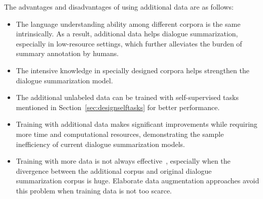The advantages and disadvantages of using additional data are as follows:
\begin{itemize}
	\item[\Checkmark] The language understanding ability among different 
corpora is the same intrinsically. As a result, additional data helps 
dialogue summarization, especially in low-resource settings, 
which further alleviates the burden of summary annotation by humans.
	\item[\Checkmark] The intensive knowledge in specially designed 
corpora helps strengthen the dialogue summarization model. 
	\item[\Checkmark] The additional unlabeled data can be trained 
with self-supervised tasks mentioned in Section~\ref{sec:designselftasks} for 
better performance.
	\item[\XSolidBrush] Training with additional data makes significant improvements while requiring 
more time and computational resources, demonstrating the sample inefficiency of current dialogue summarization models.
	\item[\XSolidBrush] Training with more data is not always effective~\cite{zhang2021exploratory,nair2021data}, especially when the divergence between 
the additional corpus and original dialogue summarization corpus is huge.  Elaborate data augmentation approaches avoid this problem when training data is not too scarce.
\end{itemize}
	
